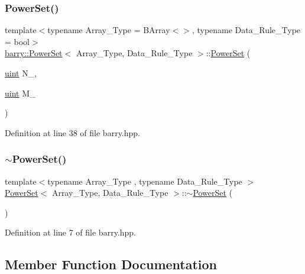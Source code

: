 \subsubsection{\texorpdfstring{Power\+Set()}{PowerSet()}\hspace{0.1cm}{\footnotesize\ttfamily [2/2]}}
{\footnotesize\ttfamily template$<$typename Array\+\_\+\+Type  = B\+Array$<$$>$, typename Data\+\_\+\+Rule\+\_\+\+Type  = bool$>$ \\
\hyperlink{classbarry_1_1_power_set}{barry\+::\+Power\+Set}$<$ Array\+\_\+\+Type, Data\+\_\+\+Rule\+\_\+\+Type $>$\+::\hyperlink{classbarry_1_1_power_set}{Power\+Set} (\begin{DoxyParamCaption}\item[{\hyperlink{namespacebarry_a11dfc53ddb4672278319aa04f1e09a6c}{uint}}]{N\+\_\+,  }\item[{\hyperlink{namespacebarry_a11dfc53ddb4672278319aa04f1e09a6c}{uint}}]{M\+\_\+ }\end{DoxyParamCaption})\hspace{0.3cm}{\ttfamily [inline]}}



Definition at line 38 of file barry.\+hpp.

\mbox{\label{classbarry_1_1_power_set_a89a176c9517e81a066adffad3c46aba5}} 
\subsubsection{\texorpdfstring{$\sim$\+Power\+Set()}{~PowerSet()}}
{\footnotesize\ttfamily template$<$typename Array\+\_\+\+Type , typename Data\+\_\+\+Rule\+\_\+\+Type $>$ \\
\hyperlink{classbarry_1_1_power_set}{Power\+Set}$<$ Array\+\_\+\+Type, Data\+\_\+\+Rule\+\_\+\+Type $>$\+::$\sim$\hyperlink{classbarry_1_1_power_set}{Power\+Set} (\begin{DoxyParamCaption}{ }\end{DoxyParamCaption})\hspace{0.3cm}{\ttfamily [inline]}}



Definition at line 7 of file barry.\+hpp.



\subsection{Member Function Documentation}
\mbox{\label{classbarry_1_1_power_set_a00ee318a40da91bcf0bff79bf71454ab}} 
